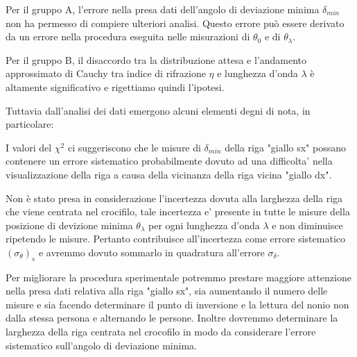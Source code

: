 Per il gruppo A, l'errore nella presa dati dell'angolo di deviazione minima $\delta_{min}$ non ha permesso di compiere ulteriori analisi.
Questo errore può essere derivato da un errore nella procedura eseguita nelle misurazioni di $\theta_0$ e di $\theta_{\lambda}$.

Per il gruppo B, il disaccordo tra la distribuzione attesa e l'andamento approssimato di Cauchy tra indice di rifrazione $\eta$ e lunghezza d'onda $\lambda$ è altamente significativo e rigettiamo quindi l'ipotesi.

Tuttavia dall'analisi dei dati emergono alcuni elementi degni di nota, in particolare:

I valori del $\chi^2$ ci suggeriscono che le misure di $\delta_{min}$ della riga "giallo sx" possano contenere un errore sistematico probabilmente dovuto ad una difficolta' nella visualizzazione della riga a causa della vicinanza della riga vicina "giallo dx".

Non è stato presa in considerazione l'incertezza dovuta alla larghezza della riga che viene centrata nel crocifilo, tale incertezza e' presente in tutte le misure della posizione di devizione minima $\theta_{\lambda}$ per ogni lunghezza d'onda $\lambda$ e non diminuisce ripetendo le misure. Pertanto contribuisce all'incertezza come errore sistematico $(\sigma_{\theta})_s$ e avremmo dovuto sommarlo in quadratura all'errore $\sigma_{\delta}$. 

Per migliorare la procedura sperimentale potremmo prestare maggiore attenzione nella presa dati relativa alla riga "giallo sx", sia aumentando il numero delle misure e sia facendo determinare il punto di inversione e la lettura del nonio non dalla stessa persona e alternando le persone.
Inoltre dovremmo determinare la larghezza della riga centrata nel crocofilo in modo da considerare l'errore sistematico sull'angolo di deviazione minima.